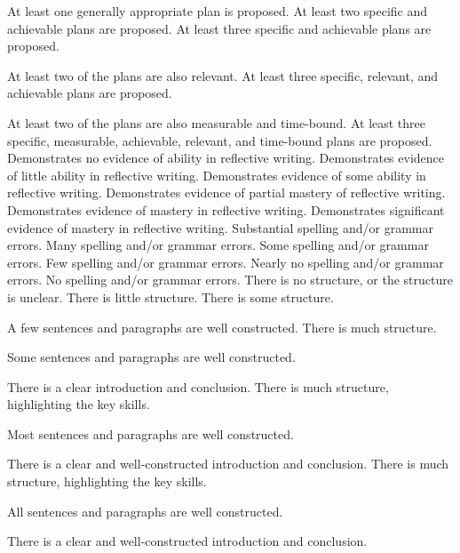 \documentclass{../fal_assignment}
\begin{document}
\begin{markingrubric}
        \grade 		At least one generally appropriate plan is proposed.
        \grade 		At least two specific and achievable plans are proposed. 
        \grade 		At least three specific and achievable plans are proposed. 
        \par 		At least two of the plans are also relevant.
        \grade 		At least three specific, relevant, and achievable plans are proposed. 
        \par 		At least two of the plans are also measurable and time-bound.
        \grade 		At least three specific, measurable, achievable, relevant, and time-bound plans are proposed. 
%
        \grade\fail 	Demonstrates no evidence of ability in reflective writing.
        \grade 		Demonstrates evidence of little ability in reflective writing.
        \grade 		Demonstrates evidence of some ability in reflective writing.  
        \grade 		Demonstrates evidence of partial mastery of reflective writing.
        \grade 		Demonstrates evidence of mastery in reflective writing.
        \grade 		Demonstrates significant evidence of mastery in reflective writing.
%
        \grade\fail 	Substantial spelling and/or grammar errors.
        \grade 		Many spelling and/or grammar errors.
        \grade 		Some spelling and/or grammar errors.  
        \grade 		Few spelling and/or grammar errors.
        \grade 		Nearly no spelling and/or grammar errors.
        \grade 		No spelling and/or grammar errors.
%
        \grade\fail 	There is no structure, or the structure is unclear.
        \grade 		There is little structure.
        \grade 		There is some structure.
        \par 		A few sentences and paragraphs are well constructed.
        \grade 		There is much structure.
        \par 		Some sentences and paragraphs are well constructed.
        \par 		There is a clear introduction and conclusion.
        \grade 		There is much structure, highlighting the key skills.
        \par 		Most sentences and paragraphs are well constructed.
        \par 		There is a clear and well-constructed introduction and conclusion.
        \grade 		There is much structure, highlighting the key skills.
        \par 		All sentences and paragraphs are well constructed.
        \par 		There is a clear and well-constructed introduction and conclusion.
\end{markingrubric}
\end{document}
